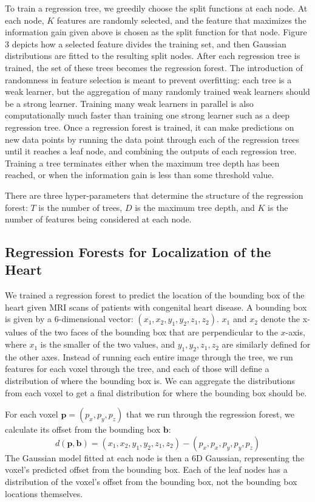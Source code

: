 To train a regression tree, we greedily choose the split functions at each node. At each node, $K$ features are randomly selected, and the feature that maximizes the information gain given above is chosen as the split function for that node. Figure 3 depicts how a selected feature divides the training set, and then Gaussian distributions are fitted to the resulting split nodes. After each regression tree is trained, the set of these trees becomes the regression forest. The introduction of randomness in feature selection is meant to prevent overfitting: each tree is a weak learner, but the aggregation of many randomly trained weak learners should be a strong learner. Training many weak learners in parallel is also computationally much faster than training one strong learner such as a deep regression tree. Once a regression forest is trained, it can make predictions on new data points by running the data point through each of the regression trees until it reaches a leaf node, and combining the outputs of each regression tree. Training a tree terminates either when the maximum tree depth has been reached, or when the information gain is less than some threshold value.

There are three hyper-parameters that determine the structure of the regression forest: $T$ is the number of trees, $D$ is the maximum tree depth, and $K$ is the number of features being considered at each node.

\subsection{Regression Forests for Localization of the Heart}
We trained a regression forest to predict the location of the bounding box of the heart given MRI scans of patients with congenital heart disease. A bounding box is given by a 6-dimensional vector: $(x_1, x_2, y_1, y_2, z_1, z_2)$. $x_1$ and $x_2$ denote the x-values of the two faces of the bounding box that are perpendicular to the $x$-axis, where $x_1$ is the smaller of the two values, and $y_1, y_2, z_1, z_2$ are similarly defined for the other axes. Instead of running each entire image through the tree, we run features for each voxel through the tree, and each of those will define a distribution of where the bounding box is. We can aggregate the distributions from each voxel to get a final distribution for where the bounding box should be.

For each voxel $\mathbf{p}=(p_x, p_y, p_z)$ that we run through the regression forest, we calculate its offset from the bounding box $\mathbf{b}$:
\begin{equation}
  d(\mathbf{p}, \mathbf{b}) = (x_1, x_2, y_1, y_2, z_1, z_2) - (p_x, p_x, p_y, p_y, p_z)
\end{equation}
The Gaussian model fitted at each node is then a 6D Gaussian, representing the voxel's predicted offset from the bounding box. Each of the leaf nodes has a distribution of the voxel's offset from the bounding box, not the bounding box locations themselves.

